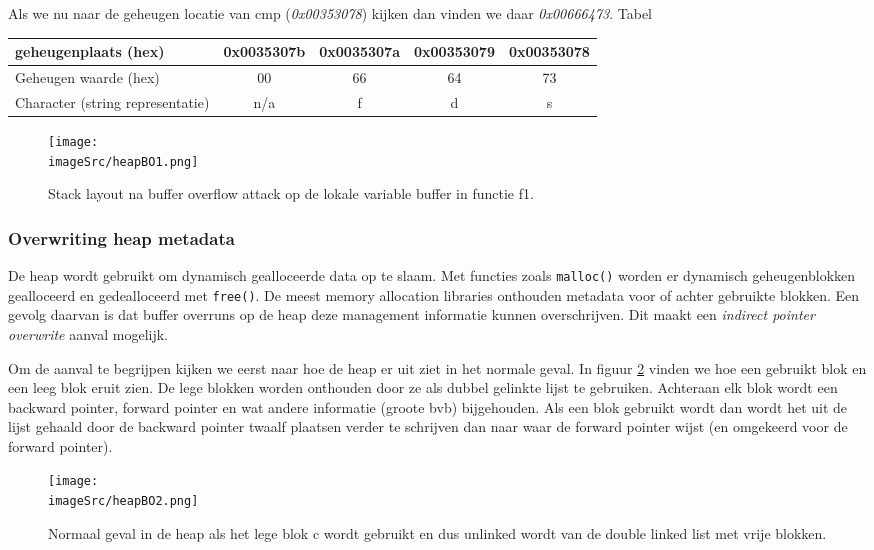 \documentclass[../main.tex]{subfiles}
\begin{document}
Als we nu naar de geheugen locatie van cmp (\emph{0x00353078}) kijken dan vinden we daar \emph{0x00666473}.
Tabel
\begin{table}
\centering
\begin{tabular}{l|cccc|}
		geheugenplaats (hex) & 0x0035307b & 0x0035307a & 0x00353079 & 0x00353078 \\ \hline
		Geheugen waarde (hex) & 00 & 66 & 64 & 73 \\ \hline
		Character (string representatie) & n/a & f & d & s \\ \hline
\end{tabular}
\end{table}

\begin{figure}
\centering
\texttt{[image: \\imageSrc/heapBO1.png]}
\caption{Stack layout na buffer overflow attack op de lokale variable buffer in functie f1.}
\label{f:heapBO1}
\end{figure}

\subsubsection{Overwriting heap metadata}
De heap wordt gebruikt om dynamisch gealloceerde data op te slaam.
Met functies zoals \lstinline[style=cstyle]{malloc()} worden er dynamisch geheugenblokken gealloceerd en gedealloceerd met \lstinline[style=cstyle]{free()}.
De meest memory allocation libraries onthouden metadata voor of achter gebruikte blokken.
Een gevolg daarvan is dat buffer overruns op de heap deze management informatie kunnen overschrijven.
Dit maakt een \emph{indirect pointer overwrite} aanval mogelijk.

Om de aanval te begrijpen kijken we eerst naar hoe de heap er uit ziet in het normale geval.
In figuur \ref{f:heapBO2} vinden we hoe een gebruikt blok en een leeg blok eruit zien.
De lege blokken worden onthouden door ze als dubbel gelinkte lijst te gebruiken.
Achteraan elk blok wordt een backward pointer, forward pointer en wat andere informatie (groote bvb) bijgehouden.
Als een blok gebruikt wordt dan wordt het uit de lijst gehaald door de backward pointer twaalf plaatsen verder te schrijven dan naar waar de forward pointer wijst (en omgekeerd voor de forward pointer).

\begin{figure}
\centering
\texttt{[image: \\imageSrc/heapBO2.png]}
\caption{Normaal geval in de heap als het lege blok c wordt gebruikt en dus unlinked wordt van de double linked list met vrije blokken.}
\label{f:heapBO2}
\end{figure}
\end{document}
